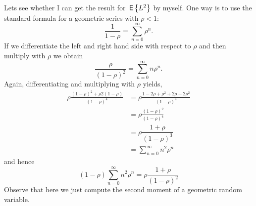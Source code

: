 \begin{exercise}
\begin{solution}
Lets see whether I can get the result for $\,\mathsf{E}\left\{L^2\right\}$ by myself.  One way
is to use the standard formula for a geometric series with $\rho < 1$:
\begin{equation*}
\dfrac{1}{1-\rho} = \sum_{n=0}^{\infty}\rho^n.
\end{equation*}
If we differentiate the left and right hand side with respect to
$\rho$  and then  multiply with $\rho$ we obtain
\begin{equation*}
\dfrac{\rho}{(1-\rho)^2}=\sum_{n=0}^{\infty}n\rho^n.
\end{equation*}
Again, differentiating and multiplying with $\rho$ yields, 
\begin{equation*}
  \begin{split}
\rho \frac{(1-\rho)^2 + \rho2(1-\rho)}{(1-\rho)^4} 
&= \rho \frac{1-2\rho+\rho^2 + 2\rho-2\rho^2}{(1-\rho)^4} \\
&= \rho \frac{(1-\rho)^2}{(1-\rho)^4} \\
&=\rho \dfrac{1+\rho}{(1-\rho)^3}\\
&=\sum_{n=0}^{\infty}n^2\rho^n
  \end{split}
\end{equation*}
and hence
\begin{equation*}
(1-\rho)\sum_{n=0}^{\infty}n^2\rho^n = \rho\dfrac{1+\rho}{(1-\rho)^2}
\end{equation*}
Observe that here we just compute the second moment of a geometric
random variable.



\end{solution}
\end{exercise}
